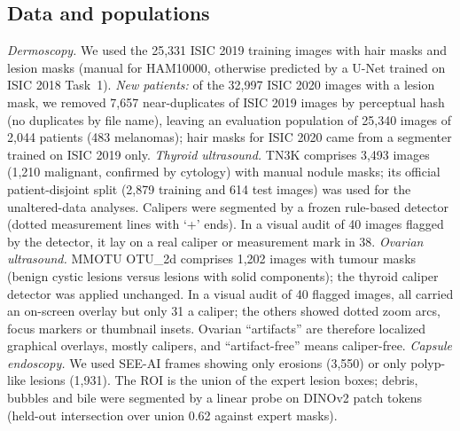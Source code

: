 \documentclass[12pt]{article}
\begin{document}
\subsection*{Data and populations}
\emph{Dermoscopy.} We used the 25,331 ISIC 2019 training images with hair masks and lesion masks (manual for HAM10000,
otherwise predicted by a U-Net trained on ISIC 2018 Task~1). \emph{New patients:} of the 32,997 ISIC 2020 images with a
lesion mask, we removed 7,657 near-duplicates of ISIC 2019 images by perceptual hash (no duplicates by file name), leaving
an evaluation population of 25,340 images of 2,044 patients (483 melanomas); hair masks for ISIC 2020 came from a
segmenter trained on ISIC 2019 only.
\emph{Thyroid ultrasound.} TN3K \cite{gong2021tn3k} comprises 3,493 images (1,210 malignant, confirmed by cytology) with
manual nodule masks; its official patient-disjoint split (2,879 training and 614 test images) was used for the
unaltered-data analyses. Calipers were segmented by a frozen rule-based detector (dotted measurement lines with `+' ends).
In a visual audit of 40 images flagged by the detector, it lay on a real caliper or measurement mark in 38.
\emph{Ovarian ultrasound.} MMOTU OTU\_2d \cite{zhao2022mmotu} comprises 1,202 images with tumour masks (benign cystic
lesions versus lesions with solid components); the thyroid caliper detector was applied unchanged. In a visual audit of 40
flagged images, all carried an on-screen overlay but only 31 a caliper; the others showed dotted zoom arcs, focus markers
or thumbnail insets. Ovarian ``artifacts'' are therefore localized graphical overlays, mostly calipers, and
``artifact-free'' means caliper-free.
\emph{Capsule endoscopy.} We used SEE-AI frames \cite{seeai2023} showing only erosions (3,550) or only polyp-like lesions
(1,931). The ROI is the union of the expert lesion boxes; debris, bubbles and bile were segmented by a linear probe on
DINOv2 patch tokens (held-out intersection over union 0.62 against expert masks).
\end{document}
